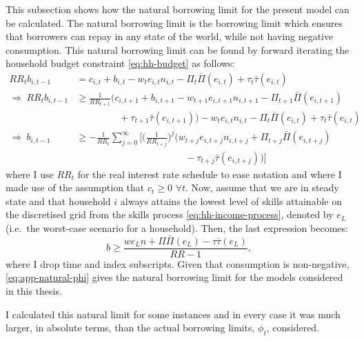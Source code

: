\documentclass[a4paper,12pt]{article} %
\numberwithin{equation}{section} %
\numberwithin{figure}{section}
\numberwithin{table}{section}
\begin{document}
\begin{refsection}
\begin{appendices}
This subsection shows how the natural borrowing limit for the present model can be calculated. The natural borrowing limit is the borrowing limit which ensures that borrowers can repay in any state of the world, while not having negative consumption. This natural borrowing limit can be found by forward iterating the household budget constraint \eqref{eq:hh-budget} as follows:
\begin{align*}
    RR_t b_{i,t-1} &= c_{i,t} + b_{i,t} - w_t e_{i,t} n_{i,t} - \Pi_t \bar{\Pi} (e_{i,t}) + \tau_t \bar{\tau} (e_{i,t}) \\
    \Rightarrow \ RR_t b_{i,t-1} &\ge \frac{1}{RR_{t+1}} \Bigg( c_{i,t+1} + b_{i,t+1} - w_{t+1} e_{i,t+1} n_{i,t+1} - \Pi_{t+1} \bar{\Pi} (e_{i,t+1}) \\
    & \ \ \ \ \ \ \ \ \ \ \ \ \ \ \ \ \ \ \ \ + \tau_{t+1} \bar{\tau} (e_{i,t+1}) \Bigg) - w_t e_{i,t} n_{i,t} - \Pi_{t} \bar{\Pi} (e_{i,t}) + \tau_t \bar{\tau} (e_{i,t}) \\
    \Rightarrow \ b_{i,t-1} &\ge - \frac{1}{RR_t} \sum_{j=0}^{\infty} \Bigg[ \Bigg( \frac{1}{RR_{t+j}} \Bigg)^j \bigg( w_{t+j} e_{i,t+j} n_{i,t+j} + \Pi_{t+j} \bar{\Pi} (e_{i,t+j}) \\ 
    & \ \ \ \ \ \ \ \ \ \ \ \ \ \ \ \ \ \ \ \ \ \ \ \ \ \ \ \ \ \ \ \ \ \ \ \ \ \ \ \ \ \ \ \ \ \ \ \ \ \ \ - \tau_{t+j} \bar{\tau} (e_{i,t+j}) \bigg) \Bigg]
\end{align*}
where I use $RR_t$ for the real interest rate schedule to ease notation and where I made use of the assumption that $c_{t} \ge 0$ $\forall t$.  Now, assume that we are in steady state and that household $i$ always attains the lowest level of skills attainable on the discretised grid from the skills process \eqref{eq:hh-income-process}, denoted by $e_L$ (i.e.~the worst-case scenario for a household). Then, the last expression becomes: 
\begin{equation}
    b \ge \frac{we_{L}n + \Pi \bar{\Pi} (e_{L}) - \tau \bar{\tau} (e_{L})}{RR - 1}, \label{eq:app-natural-phi}
\end{equation}
where I drop time and index subscripts. Given that consumption is non-negative, \eqref{eq:app-natural-phi} gives the natural borrowing limit for the models considered in this thesis.

I calculated this natural limit for some instances and in every case it was much larger, in absolute terms, than the actual borrowing limits, $\phi_t$, considered.


\end{appendices}
\end{refsection}
\end{document}
